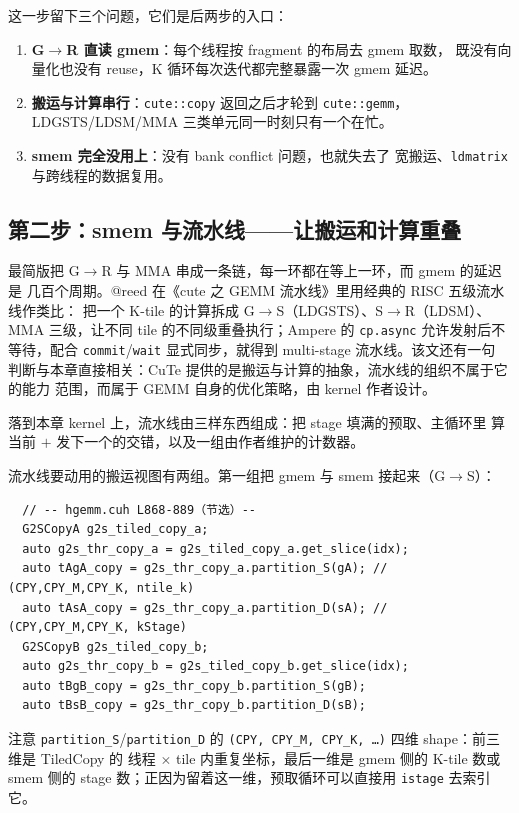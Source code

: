 这一步留下三个问题，它们是后两步的入口：

\begin{enumerate}
  \item \textbf{G$\to$R 直读 gmem}：每个线程按 fragment 的布局去 gmem 取数，
        既没有向量化也没有 reuse，K 循环每次迭代都完整暴露一次 gmem 延迟。
  \item \textbf{搬运与计算串行}：\texttt{cute::copy} 返回之后才轮到
        \texttt{cute::gemm}，LDGSTS/LDSM/MMA 三类单元同一时刻只有一个在忙。
  \item \textbf{smem 完全没用上}：没有 bank conflict 问题，也就失去了
        宽搬运、\texttt{ldmatrix} 与跨线程的数据复用。
\end{enumerate}

\subsection{第二步：smem 与流水线——让搬运和计算重叠}\label{sec:24-step2}

最简版把 G$\to$R 与 MMA 串成一条链，每一环都在等上一环，而 gmem 的延迟是
几百个周期。@reed 在《cute 之 GEMM 流水线》里用经典的 RISC 五级流水线作类比：
把一个 K-tile 的计算拆成 G$\to$S（LDGSTS）、S$\to$R（LDSM）、MMA 三级，让不同
tile 的不同级重叠执行；Ampere 的 \texttt{cp.async} 允许发射后不等待，配合
\texttt{commit}/\texttt{wait} 显式同步，就得到 multi-stage 流水线。该文还有一句
判断与本章直接相关：CuTe 提供的是搬运与计算的抽象，流水线的组织不属于它的能力
范围，而属于 GEMM 自身的优化策略，由 kernel 作者设计。

落到本章 kernel 上，流水线由三样东西组成：把 stage 填满的预取、主循环里
算当前 $+$ 发下一个的交错，以及一组由作者维护的计数器。

流水线要动用的搬运视图有两组。第一组把 gmem 与 smem 接起来（G$\to$S）：

\begin{lstlisting}
  // -- hgemm.cuh L868-889（节选）--
  G2SCopyA g2s_tiled_copy_a;
  auto g2s_thr_copy_a = g2s_tiled_copy_a.get_slice(idx);
  auto tAgA_copy = g2s_thr_copy_a.partition_S(gA); // (CPY,CPY_M,CPY_K, ntile_k)
  auto tAsA_copy = g2s_thr_copy_a.partition_D(sA); // (CPY,CPY_M,CPY_K, kStage)
  G2SCopyB g2s_tiled_copy_b;
  auto g2s_thr_copy_b = g2s_tiled_copy_b.get_slice(idx);
  auto tBgB_copy = g2s_thr_copy_b.partition_S(gB);
  auto tBsB_copy = g2s_thr_copy_b.partition_D(sB);
\end{lstlisting}

注意 \texttt{partition\_S}/\texttt{partition\_D} 的
\texttt{(CPY, CPY\_M, CPY\_K, \dots)} 四维 shape：前三维是 TiledCopy 的
线程 $\times$ tile 内重复坐标，最后一维是 gmem 侧的 K-tile 数或 smem 侧的
stage 数；正因为留着这一维，预取循环可以直接用 \texttt{istage} 去索引它。


